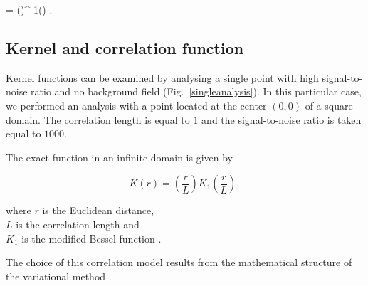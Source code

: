 \be
\boldsymbol{\varphi} = ()^{-1}() .
\label{eq:solution2}
\ee


\subsection{Kernel and correlation function \label{sec:kernel}}

Kernel functions  can be examined by analysing a single point with high signal-to-noise ratio and no background field (Fig.~\ref{singleanalysis}). In this particular case, we performed an analysis with a point located at the center $(0,0)$ of a square domain. The correlation length is equal to $1$ and the signal-to-noise ratio is taken equal to $1000$.

The exact function in an infinite domain is given by 

\begin{equation}
K(r)=\left(\frac{r}{L}\right)K_{1}\left(\frac{r}{L}\right),
\label{kernelfunction}
\end{equation}

where $r$ is the Euclidean distance,\\ 
\hphantom{where} $L$ is the correlation length and \\
\hphantom{where} $K_{1}$ is the modified Bessel function \citep[][page 359]{ABRAMOWITZ64}.

%
%
%
%
%
%
%

The choice of this correlation model results from the mathematical structure of the variational method \citep{BRASSEUR96}.

